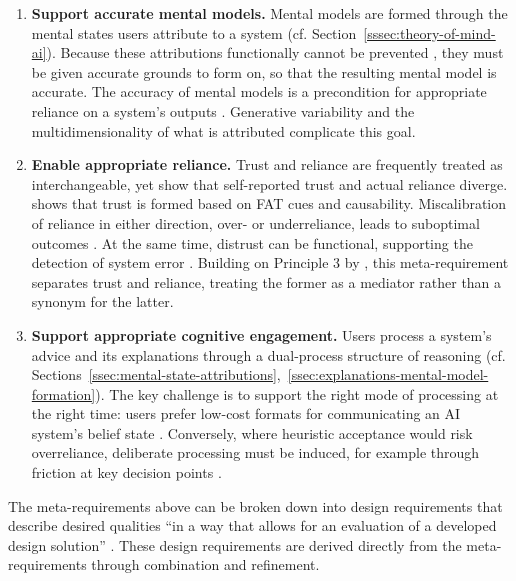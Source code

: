 \begin{enumerate}[label=\textbf{MR\arabic*}, leftmargin=*]
    \item \textbf{Support accurate mental models.} Mental models are formed through the mental states users attribute to a system (cf. Section~\ref{sssec:theory-of-mind-ai}). Because these attributions functionally cannot be prevented \parencite[cf.][]{Weisz2025}, they must be given accurate grounds to form on, so that the resulting mental model is accurate. The accuracy of mental models is a precondition for appropriate reliance on a system's outputs \parencite{Jussupow2021}. Generative variability \parencite{Weisz2025} and the multidimensionality of what is attributed \parencite{Colombatto2025} complicate this goal.
    \item \textbf{Enable appropriate reliance.} Trust and reliance are frequently treated as interchangeable, yet \textcite{Colombatto2025} show that self-reported trust and actual reliance diverge. \textcite{Shin2021} shows that trust is formed based on \ac{FAT} cues and causability. Miscalibration of reliance in either direction, over- or underreliance, leads to suboptimal outcomes \parencite{Jussupow2021}. At the same time, distrust can be functional, supporting the detection of system error \parencite{Hoffman2023}. Building on Principle 3 by \textcite{Weisz2025}, this meta-requirement separates trust and reliance, treating the former as a mediator rather than a synonym for the latter.
    \item \textbf{Support appropriate cognitive engagement.} Users process a system's advice and its explanations through a dual-process structure of reasoning (cf. Sections~\ref{ssec:mental-state-attributions},~\ref{ssec:explanations-mental-model-formation}). The key challenge is to support the right mode of processing at the right time: users prefer low-cost formats for communicating an \ac{AI} system's belief state \parencite{Ying2024}. Conversely, where heuristic acceptance would risk overreliance, deliberate processing must be induced, for example through friction at key decision points \parencite{Buinca2021,Weisz2025}.
\end{enumerate}

The meta-requirements above can be broken down into design requirements that describe desired qualities \enquote{in a way that allows for an evaluation of a developed design solution} \parencite{Herm2022}. These design requirements are derived directly from the meta-requirements through combination and refinement.

